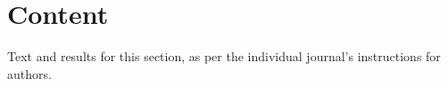 \documentclass[twocolumn]{bmcart}%
\begin{document}


\section*{Content}
Text and results for this section, as per the individual journal's instructions for authors. %
\end{document}
